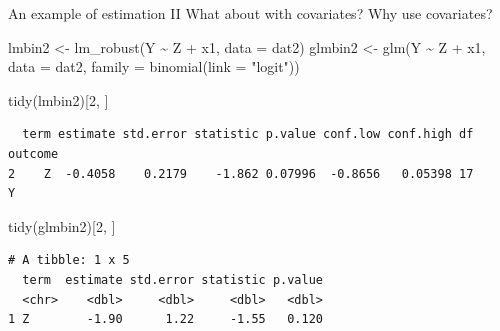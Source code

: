 \documentclass[
  ignorenonframetext,
]{beamer}
\newenvironment{Shaded}{\begin{snugshade}}{\end{snugshade}}
\newcommand{\AttributeTok}[1]{\textcolor[rgb]{0.77,0.63,0.00}{#1}}
\newcommand{\DecValTok}[1]{\textcolor[rgb]{0.00,0.00,0.81}{#1}}
\newcommand{\FunctionTok}[1]{\textcolor[rgb]{0.00,0.00,0.00}{#1}}
\newcommand{\NormalTok}[1]{#1}
\newcommand{\OtherTok}[1]{\textcolor[rgb]{0.56,0.35,0.01}{#1}}
\newcommand{\SpecialCharTok}[1]{\textcolor[rgb]{0.00,0.00,0.00}{#1}}
\newcommand{\StringTok}[1]{\textcolor[rgb]{0.31,0.60,0.02}{#1}}
\begin{document}
\begin{frame}[fragile]{An example of estimation II}
\protect\hypertarget{an-example-of-estimation-ii}{}
What about with covariates? Why use covariates?

\scriptsize

\begin{Shaded}
\begin{Highlighting}[]
\NormalTok{lmbin2 }\OtherTok{\textless{}{-}} \FunctionTok{lm\_robust}\NormalTok{(Y }\SpecialCharTok{\textasciitilde{}}\NormalTok{ Z }\SpecialCharTok{+}\NormalTok{ x1, }\AttributeTok{data =}\NormalTok{ dat2)}
\NormalTok{glmbin2 }\OtherTok{\textless{}{-}} \FunctionTok{glm}\NormalTok{(Y }\SpecialCharTok{\textasciitilde{}}\NormalTok{ Z }\SpecialCharTok{+}\NormalTok{ x1, }\AttributeTok{data =}\NormalTok{ dat2, }\AttributeTok{family =} \FunctionTok{binomial}\NormalTok{(}\AttributeTok{link =} \StringTok{"logit"}\NormalTok{))}

\FunctionTok{tidy}\NormalTok{(lmbin2)[}\DecValTok{2}\NormalTok{, ]}
\end{Highlighting}
\end{Shaded}

\begin{verbatim}
  term estimate std.error statistic p.value conf.low conf.high df outcome
2    Z  -0.4058    0.2179    -1.862 0.07996  -0.8656   0.05398 17       Y
\end{verbatim}

\begin{Shaded}
\begin{Highlighting}[]
\FunctionTok{tidy}\NormalTok{(glmbin2)[}\DecValTok{2}\NormalTok{, ]}
\end{Highlighting}
\end{Shaded}

\begin{verbatim}
# A tibble: 1 x 5
  term  estimate std.error statistic p.value
  <chr>    <dbl>     <dbl>     <dbl>   <dbl>
1 Z        -1.90      1.22     -1.55   0.120
\end{verbatim}

\normalsize
\end{frame}
\end{document}
